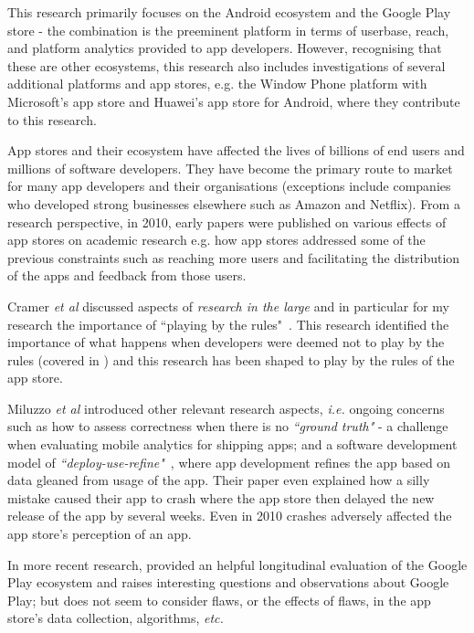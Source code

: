 This research primarily focuses on the Android ecosystem and the Google Play store - the combination is the preeminent platform in terms of userbase, reach, and platform analytics provided to app developers. However, recognising that these are other ecosystems, this research also includes investigations of several additional platforms and app stores, e.g. the Window Phone platform with Microsoft's app store and Huawei's app store for Android, where they contribute to this research. 


App stores and their ecosystem have affected the lives of billions of end users and millions of software developers. They have become the primary route to market for many app developers and their organisations (exceptions include companies who developed strong businesses elsewhere such as Amazon and Netflix). 
From a research perspective, in 2010, early papers were published on various effects of app stores on academic research e.g. how app stores addressed some of the previous constraints such as reaching more users and facilitating the distribution of the apps and feedback from those users. 

Cramer \emph{et al} discussed aspects of \emph{research in the large} and in particular for my research the importance of ``playing by the rules"~. This research identified the importance of what happens when developers were deemed not to play by the rules (covered in ) and this research has been shaped to play by the rules of the app store. %

Miluzzo \emph{et al} introduced other relevant research aspects, \textit{i.e.}  ongoing concerns such as how to assess correctness when there is no \emph{``ground truth"} - a challenge when evaluating mobile analytics for shipping apps; and a software development model of \textit{``deploy-use-refine"}~, where app development refines the app based on data gleaned from usage of the app. Their paper even explained how a silly mistake caused their app to crash where the app store then delayed the new release of the app by several weeks. Even in 2010 crashes adversely affected the app store's perception of an app. %


In more recent research, \textcite{wang2019_understanding_the_evolution_of_mobile_app_ecosystems_a_longitudinal_measurement_of_google_play} provided an helpful longitudinal evaluation of the Google Play ecosystem and raises interesting questions and observations about Google Play; but does not seem to consider flaws, or the effects of flaws, in the app store's data collection, algorithms,\textit{ etc.}

